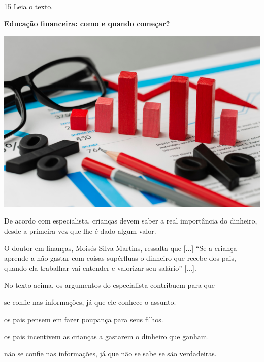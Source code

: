 \num{15} Leia o texto.

\begin{myquote}
\textbf{Educação financeira: como e quando começar?}

\begin{center}
\includegraphics[width=\textwidth]{./media/image23p.jpg}
\end{center}

De acordo com especialista, crianças devem saber a real importância do
dinheiro, desde a primeira vez que lhe é dado algum valor.

O doutor em finanças, Moisés Silva Martins, ressalta que {[}...{]} ``Se
a criança aprende a não gastar com coisas supérfluas o dinheiro que
recebe dos pais, quando ela trabalhar vai entender e valorizar seu
salário'' {[}...{]}.

\end{myquote}

No texto acima, os argumentos do especialista contribuem para que

\begin{escolha}
\item se confie nas informações, já que ele conhece o assunto.

\item os pais pensem em fazer poupança para seus filhos.

\item os pais incentivem as crianças a gastarem o dinheiro que ganham.

\item não se confie nas informações, já que não se sabe se são verdadeiras.
\end{escolha}

